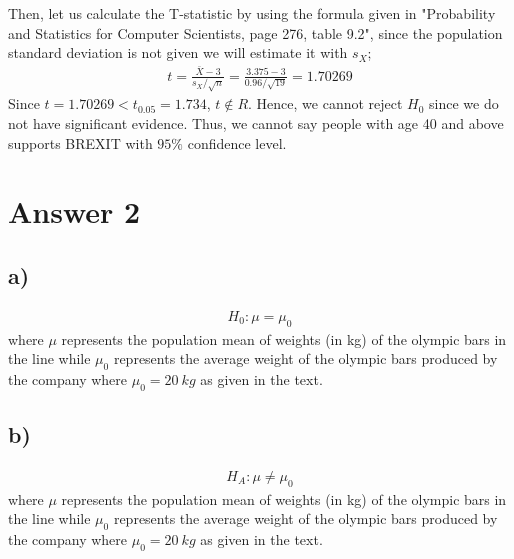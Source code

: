 \documentclass[12pt]{article}
\begin{document}
Then, let us calculate the T-statistic by using the formula given in "Probability and Statistics for Computer Scientists, page 276, table 9.2", since the population standard deviation is not given we will estimate it with $s_{X}$;
\begin{equation} 
\begin{split}
t = \frac{\bar{X}-3}{s_{X}/\sqrt{n}} = \frac{3.375-3}{0.96/\sqrt{19}} = 1.70269
\end{split}
\end{equation}
Since $t = 1.70269 < t_{0.05} = 1.734$, $t \notin R$. Hence, we cannot reject $H_{0}$ since we do not have significant evidence. Thus, we cannot say people with
age 40 and above supports BREXIT with $95\%$ confidence level.

\section*{Answer 2}
\subsection*{a)} 
\begin{equation*} 
\begin{split}
H_{0}: \mu = \mu_{0}
\end{split}
\end{equation*}
where $\mu$ represents the population mean of weights (in kg) of the olympic bars in the line while $\mu_{0}$ represents the average weight of the olympic bars produced by the company where $\mu_{0} = 20 \ kg$ as given in the text.
\subsection*{b)} 
\begin{equation*} 
\begin{split}
H_{A}: \mu \neq \mu_{0}
\end{split}
\end{equation*}
where $\mu$ represents the population mean of weights (in kg) of the olympic bars in the line while $\mu_{0}$ represents the average weight of the olympic bars produced by the company where $\mu_{0} = 20 \ kg$ as given in the text.
\end{document}
